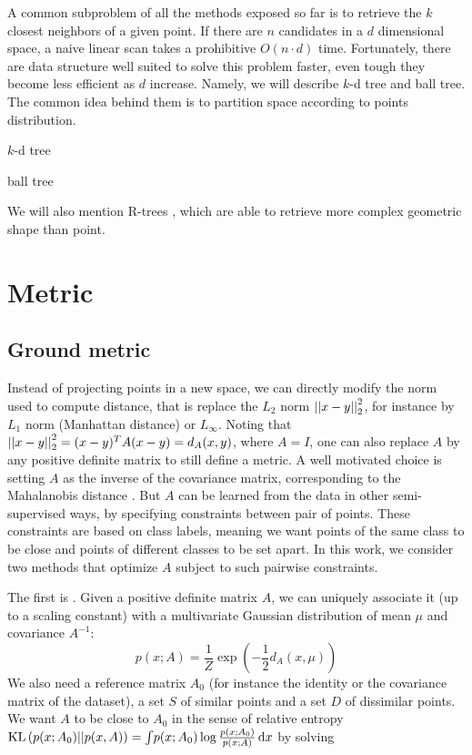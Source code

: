 A common subproblem of all the methods exposed so far is to retrieve the $k$
closest neighbors of a given point. If there are $n$ candidates in a $d$
dimensional space, a naive linear scan takes a prohibitive $O(n\cdot d)$ time.
Fortunately, there are data structure well suited to solve this problem faster,
even tough they become less efficient as $d$ increase. Namely, we will describe
$k$-d tree and ball tree. The common idea behind them is to partition space
according to points distribution.

$k$-d tree \autocite{kdtree75}

ball tree \autocite{BallTree89}

We will also mention R-trees \autocite{Rindex84}, which are able to retrieve
more complex geometric shape than point.

\section{Metric}
\label{sec:metric}

\subsection{Ground metric}

Instead of projecting points in a new space, we can directly modify the norm
used to compute distance, that is replace the $L_2$ norm $\left|\left|x-y\right|\right|_2^2$,
for instance by $L_1$ norm (Manhattan distance) or $L_\infty$. Noting that
$\left|\left|x-y\right|\right|_2^2 = (x-y)^T A (x-y) = d_A(x,y)$, where $A=I$, one can also
replace $A$ by any positive definite matrix to still define a metric. A well
motivated choice is setting $A$ as the inverse of the covariance matrix,
corresponding to the Mahalanobis distance \autocite{Mahalanobis36}. But $A$
can be learned from the data in other semi-supervised ways, by specifying
constraints between pair of points. These constraints are based on class
labels, meaning we want points of the same class to be close and points of
different classes to be set apart. In this work, we consider two methods that
optimize $A$ subject to such pairwise constraints.

The first is 
\autocite{InfoMetric07}. Given a positive definite matrix $A$, we can uniquely
associate it (up to a scaling constant) with a multivariate Gaussian
distribution of mean $\mu$ and covariance $A^{-1}$: \[p(x; A) =
\frac{1}{Z}\exp\left(-\frac{1}{2}d_A(x, \mu)\right)\]  We also need a reference
matrix $A_0$ (for instance the identity or the covariance matrix of the
dataset), a set $S$ of similar points and a set $D$ of dissimilar points. We
want $A$ to be close to $A_0$ in the sense of relative entropy $\mathrm{KL}\left(p(x;
A_0)||p(x,A)\right) = \int \! p(x; A_0) \log\frac{p(x; A_0)}{p(x; A)}\, \mathrm{d}x$
by solving


